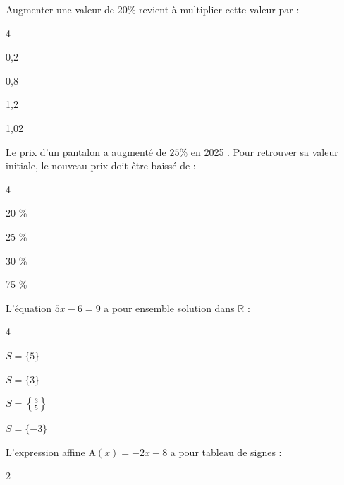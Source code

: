 \documentclass[11pt,a4paper]{article}  %
\begin{document}
\begin{enumMet}
	\item Augmenter une valeur de $20 \%$ revient à multiplier cette valeur par :
	\begin{multicols}{4}
	\begin{enumMet}
		\item 	0,2
		\item 0,8
		\item 1,2
		\item 1,02
	\end{enumMet}
	\end{multicols}
	\item Le prix d'un pantalon a augmenté de $25 \%$ en 2025 . Pour retrouver sa valeur initiale, le nouveau prix doit être baissé de :
	\begin{multicols}{4}
		\begin{enumMet}
		\item 20 \%
		\item 25 \%
		\item 30 \%
		\item 75 \%
	\end{enumMet}
	\end{multicols}
	\item L'équation $5 x-6=9$ a pour ensemble solution dans $\mathbb{R}$ :
	\begin{multicols}{4}
		\begin{enumMet}
			\item $S=\{5\}$
			\item $S=\{3\}$
			\item $S=\left\{\frac{3}{5}\right\}$
			\item $S=\{-3\}$
		\end{enumMet}
	\end{multicols}
	\item L'expression affine $\mathrm{A}(x)=-2 x+8$ a pour tableau de signes :
	\begin{multicols}{2}
		\begin{enumMet}
		\item {}	
		\item {}	

\end{enumMet}
\end{multicols}
\end{enumMet}
\end{document}
